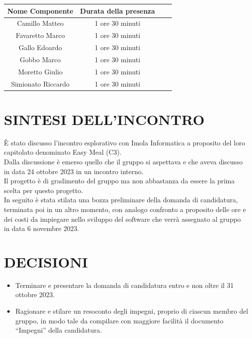 \documentclass[5pt]{article}
\begin{document}
\begin{table}[ht]
  \begin{tabular}{|Sc|Sc|}
    \hline
    \textbf{Nome Componente} & \textbf{Durata della presenza} \\
    \hline
    Camillo Matteo & 1 ore 30 minuti \\
    Favaretto Marco & 1 ore 30 minuti \\
    Gallo Edoardo & 1 ore 30 minuti \\
    Gobbo Marco & 1 ore 30 minuti \\
    Moretto Giulio & 1 ore 30 minuti \\
    Simionato Riccardo & 1 ore 30 minuti \\
    \hline
  \end{tabular}
  \label{tab:conference}
\end{table}

\section{SINTESI DELL'INCONTRO}
È stato discusso l’incontro esplorativo con Imola Informatica a proposito del loro capitolato denominato Easy Meal (C3).\\ 
Dalla discussione è emerso quello che il gruppo si aspettava e che aveva discusso in data 24 ottobre 2023 in un incontro interno.\\ 
Il progetto è di gradimento del gruppo ma non abbastanza da essere la prima scelta per questo progetto.\\

\vspace{10pt}
\noindent In seguito è stata stilata una bozza preliminare della domanda di candidatura, terminata poi in un altro momento, con analogo confronto a proposito delle ore e dei costi da impiegare nello sviluppo del software che verrà assegnato al gruppo in data 6 novembre 2023.

\section{DECISIONI}
\begin{itemize}
    \item Terminare e presentare la domanda di candidatura entro e non oltre il 31 ottobre 2023.
    \item Ragionare e stilare un resoconto degli impegni, proprio di ciascun membro del gruppo, in modo tale da compilare con maggiore facilità il documento “Impegni” della candidatura.
\end{itemize}
\end{document}
